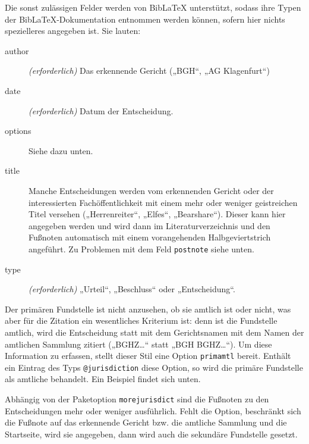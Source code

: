 \documentclass[11pt,a4paper,DIV=calc]{scrartcl}
\newcommand\software[1]{\textsf{#1}}
\newcommand\Biblatex{\software{Bib\LaTeX{}}\xspace}
\begin{document}
Die sonst zulässigen Felder werden von \Biblatex unterstützt, sodass
ihre Typen der \Biblatex-Do\-ku\-men\-ta\-tion entnommen werden können, sofern
hier nichts spezielleres angegeben ist. Sie lauten:

\begin{description}
\item[author] \emph{(erforderlich)} Das erkennende Gericht („BGH“, „AG Klagenfurt“)
\item[date] \emph{(erforderlich)} Datum der Entscheidung.
\item[options] Siehe dazu unten.
\item[title] Manche Entscheidungen werden vom erkennenden Gericht oder
  der interessierten Fachöffentlichkeit mit einem mehr oder weniger
  geistreichen Titel versehen („Herrenreiter“, „Elfes“,
  „Bearshare“). Dieser kann hier angegeben werden und wird dann im
  Literaturverzeichnis und den Fußnoten automatisch mit einem
  vorangehenden Halbgeviertstrich angeführt. Zu Problemen mit dem Feld
  \verb+postnote+ siehe unten.
\item[type] \emph{(erforderlich)} „Urteil“, „Beschluss“ oder
  „Entscheidung“.
\end{description}

Der primären Fundstelle ist nicht anzusehen, ob sie amtlich ist oder
nicht, was aber für die Zitation ein wesentliches Kriterium ist: denn
ist die Fundstelle amtlich, wird die Entscheidung statt mit dem
Gerichtsnamen mit dem Namen der amtlichen Sammlung zitiert („BGHZ\ldots“
statt „BGH BGHZ\ldots“). Um diese Information zu erfassen, stellt
dieser Stil eine Option \verb+primamtl+ bereit. Enthält ein Eintrag
des Typs \verb+@jurisdiction+ diese Option, so wird die primäre
Fundstelle als amtliche behandelt. Ein Beispiel findet sich unten.

Abhängig von der Paketoption \verb+morejurisdict+ sind die Fußnoten zu
den Entscheidungen mehr oder weniger ausführlich. Fehlt die Option,
beschränkt sich die Fußnote auf das erkennende Gericht bzw. die
amtliche Sammlung und die Startseite, wird sie angegeben, dann wird auch
die sekundäre Fundstelle gesetzt.
\end{document}
